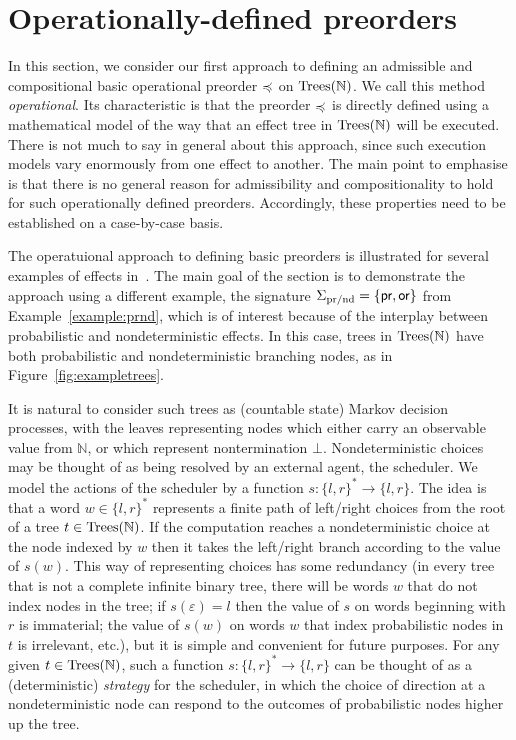 \section{Operationally-defined preorders}
\label{section:operational}

In this section, we consider our first approach to defining an admissible and compositional basic operational
preorder $\preccurlyeq$ on $\textnormal{Trees}(\mathbb{N})$. We call this method \emph{operational}. Its characteristic is that the preorder
 $\preccurlyeq$ is directly defined using a mathematical model of the way that an effect tree in $\textnormal{Trees}(\mathbb{\mathbb{N}})$ will be executed.
There is not much to say in general about this approach, since such execution models vary enormously from one effect to another.
The main point to emphasise is that there is no general reason for  admissibility and compositionality to hold for such operationally defined preorders. Accordingly, these properties need to be established on a case-by-case basis.

The operatuional approach to defining basic preorders is illustrated for several examples of effects in~\cite{gom}. 
The main goal of the section is to demonstrate the approach using a different example, the signature
$\Sigma_{\text{pr/nd}} = \{\operatorname{\textsf{pr}},\operatorname{\textsf{or}}\}$ from Example~\ref{example:prnd}, which is of interest because of the 
interplay between probabilistic and nondeterministic effects. 
In this case, trees in $\textnormal{Trees}(\mathbb{N})$ have both probabilistic and nondeterministic branching nodes,
as in Figure~\ref{fig:exampletrees}.


It is natural to consider such trees as (countable state) Markov decision processes, with the leaves representing nodes which either carry an observable value from $\mathbb{N}$, or which represent nontermination $\bot$.
Nondeterministic choices may be thought of as being resolved by an external agent, the scheduler. We model the actions of the scheduler by a 
function $s: \{l,r\}^* \to \{l,r\}$. The idea is that a word $w \in \{l,r\}^*$ represents a finite path of left/right choices from the root of a 
tree $t \in \textnormal{Trees}(\mathbb{N})$. If the computation reaches a nondeterministic choice at the node indexed by 
$w$ then it takes the left/right branch according to the value of $s(w)$. This way of representing choices has some redundancy
(in every tree that is not a complete infinite binary tree, there will be words $w$ that do not index nodes in the tree; if $s(\varepsilon) = l$ then the value of $s$ on words beginning with $r$ is immaterial; the value of $s(w)$ on words $w$ that index 
probabilistic nodes in $t$ is irrelevant, etc.), but it is simple and convenient for future purposes. 
For any given $t \in \textnormal{Trees}(\mathbb{N})$, such a function
$s: \{l,r\}^* \to \{l,r\}$ can be thought of as a (deterministic) \emph{strategy} for the scheduler, in which the choice of direction at a nondeterministic node  
can respond to  the outcomes of probabilistic nodes higher up the tree.

